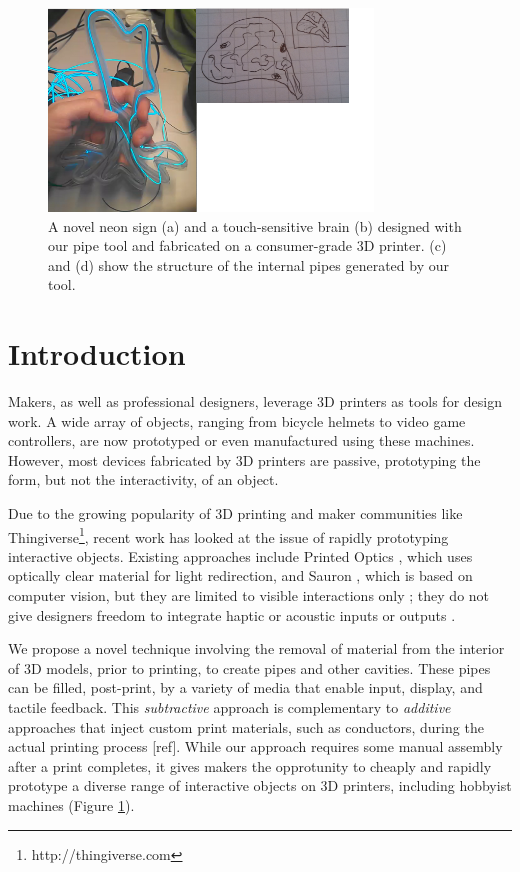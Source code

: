 \begin{figure}[h]
\centering
    \includegraphics[width=3.4in]{figures/placeholder/teaser.png}
\caption{A novel neon sign (a) and a touch-sensitive brain (b) designed with our pipe tool and fabricated on a consumer-grade 3D printer.  (c) and (d) show the structure of the internal pipes generated by our tool.   }
\label{fig:teaser}
\end{figure}

\section{Introduction}
Makers, as well as professional designers, leverage 3D printers as tools for design work.  A wide array of objects, ranging from bicycle helmets to video game controllers, are now prototyped or even manufactured using these machines.  However, most devices fabricated by 3D printers are passive, prototyping the form, but not the interactivity, of an object.  

Due to the growing popularity of 3D printing and maker communities like Thingiverse\footnote{http://thingiverse.com}, recent work has looked at the issue of rapidly prototyping interactive objects. Existing approaches include Printed Optics \cite{Willis-printedoptics}, which uses optically clear material for light redirection, and Sauron \cite{Savage-sauron}, which is based on computer vision, but they are limited to visible interactions only ; they do not give designers freedom to integrate haptic or acoustic inputs or outputs .

We propose a novel technique involving the removal of material from the interior of 3D models, prior to printing, to create pipes and other cavities.  These pipes can be filled, post-print, by a variety of media that enable input, display, and tactile feedback.  This {\em subtractive} approach is complementary to {\em additive} approaches that inject custom print materials, such as conductors, during the actual printing process [ref]. While our approach requires some manual assembly after a print completes, it gives makers the opprotunity to cheaply and rapidly prototype a diverse range of interactive objects on 3D printers, including hobbyist machines (Figure \ref{fig:teaser}).

